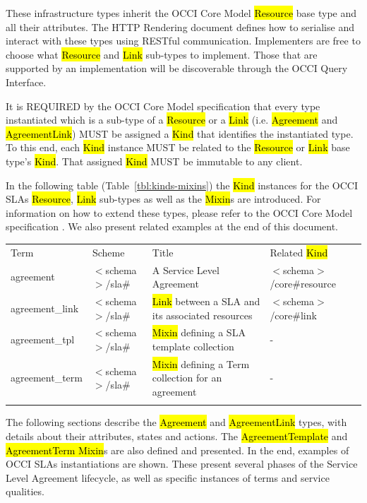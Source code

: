 \documentclass[10pt,a4paper]{article}
\begin{document}
These infrastructure types inherit the OCCI Core Model \hl{Resource}
base type and all their attributes. The HTTP Rendering document
\cite{occi:http_rendering} defines how to serialise and interact with
these types using RESTful communication. Implementers are free to
choose what \hl{Resource} and \hl{Link} sub-types to implement. Those
that are supported by an implementation will be discoverable through
the OCCI Query Interface.

It is REQUIRED by the OCCI Core Model specification that every type instantiated which is a sub-type of a \hl{Resource} or a \hl{Link} (i.e. \hl{Agreement} and \hl{AgreementLink}) MUST be assigned a \hl{Kind} that identifies the instantiated type. To this end, each \hl{Kind} instance MUST be related to the \hl{Resource} or \hl{Link} base type’s \hl{Kind}. That assigned \hl{Kind} MUST be immutable to any client.

In the following table (Table~\ref{tbl:kinds-mixins}) the \hl{Kind} instances for the OCCI SLAs \hl{Resource}, \hl{Link} sub-types as well as the \hl{Mixin}s are introduced. For information on how to extend these types, please refer to the OCCI Core Model specification \cite{occi:core}. We also present related examples at the end of this document.


	{
	\begin{tabular}{llll}
	\toprule
	Term & Scheme & Title & Related \hl{Kind} \\
	\colrule
	agreement &  $<$schema$>$/sla\# & A Service Level Agreement	& $<$schema$>$/core\#resource \\
	agreement\_link & $<$schema$>$/sla\# & \hl{Link} between a SLA and its associated resources	& $<$schema$>$/core\#link \\
	agreement\_tpl & $<$schema$>$/sla\# & \hl{Mixin} defining a SLA template collection	& - \\
	agreement\_term & $<$schema$>$/sla\# & \hl{Mixin} defining a Term collection for an agreement	& - \\
	\botrule
	\end{tabular}
}



The following sections describe the \hl{Agreement} and \hl{AgreementLink} types, with details about their attributes, states and actions. The \hl{AgreementTemplate} and \hl{AgreementTerm Mixin}s are also defined and presented. In the end, examples of OCCI SLAs instantiations are shown. These present several phases of the Service Level Agreement lifecycle, as well as specific instances of terms and service qualities.
\end{document}
